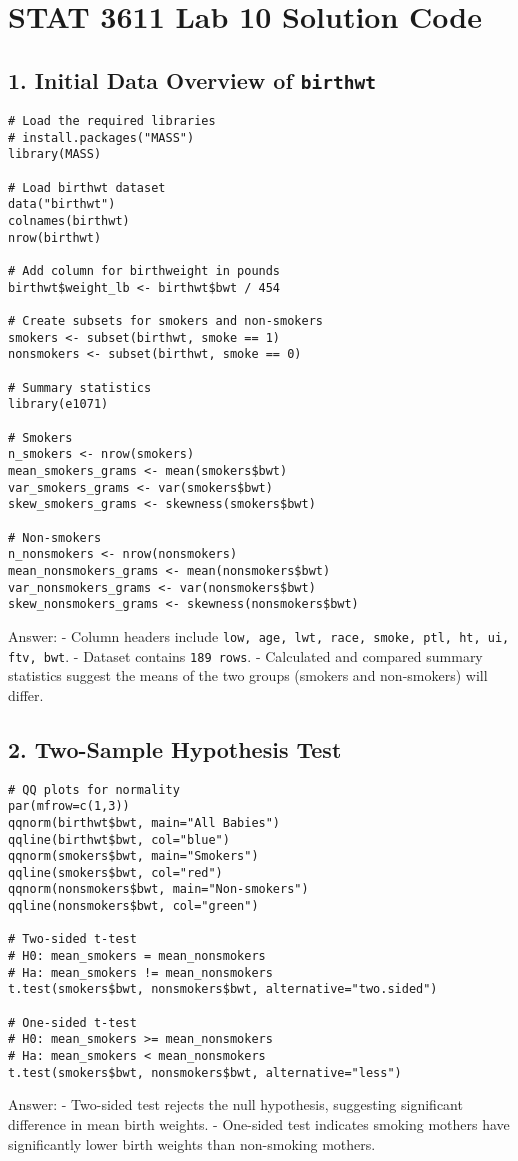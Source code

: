 \documentclass{article}
\begin{document}
\section*{STAT 3611 Lab 10 Solution Code}

\subsection*{1. Initial Data Overview of \texttt{birthwt}}
\begin{lstlisting}
# Load the required libraries
# install.packages("MASS")
library(MASS)

# Load birthwt dataset
data("birthwt")
colnames(birthwt)
nrow(birthwt)

# Add column for birthweight in pounds
birthwt$weight_lb <- birthwt$bwt / 454

# Create subsets for smokers and non-smokers
smokers <- subset(birthwt, smoke == 1)
nonsmokers <- subset(birthwt, smoke == 0)

# Summary statistics
library(e1071)

# Smokers
n_smokers <- nrow(smokers)
mean_smokers_grams <- mean(smokers$bwt)
var_smokers_grams <- var(smokers$bwt)
skew_smokers_grams <- skewness(smokers$bwt)

# Non-smokers
n_nonsmokers <- nrow(nonsmokers)
mean_nonsmokers_grams <- mean(nonsmokers$bwt)
var_nonsmokers_grams <- var(nonsmokers$bwt)
skew_nonsmokers_grams <- skewness(nonsmokers$bwt)
\end{lstlisting}
Answer:
- Column headers include \texttt{low, age, lwt, race, smoke, ptl, ht, ui, ftv, bwt}.
- Dataset contains \texttt{189 rows}.
- Calculated and compared summary statistics suggest the means of the two groups (smokers and non-smokers) will differ.

\subsection*{2. Two-Sample Hypothesis Test}
\begin{lstlisting}
# QQ plots for normality
par(mfrow=c(1,3))
qqnorm(birthwt$bwt, main="All Babies")
qqline(birthwt$bwt, col="blue")
qqnorm(smokers$bwt, main="Smokers")
qqline(smokers$bwt, col="red")
qqnorm(nonsmokers$bwt, main="Non-smokers")
qqline(nonsmokers$bwt, col="green")

# Two-sided t-test
# H0: mean_smokers = mean_nonsmokers
# Ha: mean_smokers != mean_nonsmokers
t.test(smokers$bwt, nonsmokers$bwt, alternative="two.sided")

# One-sided t-test
# H0: mean_smokers >= mean_nonsmokers
# Ha: mean_smokers < mean_nonsmokers
t.test(smokers$bwt, nonsmokers$bwt, alternative="less")
\end{lstlisting}
Answer:
- Two-sided test rejects the null hypothesis, suggesting significant difference in mean birth weights.
- One-sided test indicates smoking mothers have significantly lower birth weights than non-smoking mothers.
\end{document}
